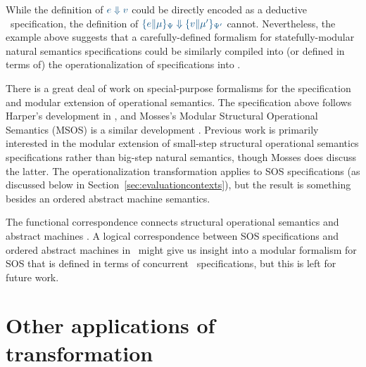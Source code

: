 While the definition of $\obj{e \Downarrow v}$ could be directly encoded
as a deductive \sls~specification, the definition of
$\obj{\{ e \| \mu \}_{\Psi} \Downarrow \{ v \| \mu' \}_{\Psi'}}$ cannot.
Nevertheless, the example above suggests
that a carefully-defined formalism for statefully-modular natural
semantics specifications could be similarly compiled into (or
defined in terms of) the operationalization of specifications
into \sls.

There is a great deal of work on special-purpose formalisms for the 
specification and modular extension of operational semantics. 
The specification above follows Harper's development
in \cite{harper12practical}, and Mosses's Modular Structural
Operational Semantics (MSOS) is a similar development 
\cite{mosses04modular}. Previous work is primarily interested in the
modular extension of small-step structural operational semantics
specifications rather than big-step natural semantics, though Mosses
does discuss the latter. The operationalization transformation applies
to SOS specifications (as discussed below in
Section~\ref{sec:evaluationcontexts}), but the result is something
besides an ordered abstract machine semantics.

The functional correspondence connects structural operational
semantics and abstract machines \cite{danvy08defunctionalized}. A
logical correspondence between SOS specifications and ordered abstract
machines in \sls~might give us insight into a modular formalism for
SOS that is defined in terms of concurrent \sls~specifications, but
this is left for future work.


\section{Other applications of transformation}
\label{sec:othertransform}

